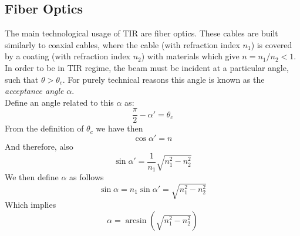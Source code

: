 \documentclass[../electromagnetism.tex]{subfiles}
\begin{document}
\subsection{Fiber Optics}
The main technological usage of TIR are fiber optics. These cables are built similarly to coaxial cables, where the cable (with refraction index $n_1$) is covered by a coating (with refraction index $n_2$) with materials which give $n=n_1/n_2<1$. In order to be in TIR regime, the beam must be incident at a particular angle, such that $\theta>\theta_c$. For purely technical reasons this angle is known as the \textit{acceptance angle} $\alpha$.\\
Define an angle related to this $\alpha$ as:
\begin{equation*}
	\frac{\pi}{2}-\alpha'=\theta_c
\end{equation*}
From the definition of $\theta_c$ we have then
\begin{equation*}
	\cos\alpha'=n
\end{equation*}
And therefore, also
\begin{equation*}
	\sin\alpha'=\frac{1}{n_1}\sqrt{n_1^2-n_2^2}
\end{equation*}
We then define $\alpha$ as follows
\begin{equation}
	\sin\alpha=n_1\sin\alpha'=\sqrt{n_1^2-n_2^2}
	\label{eq:accangsnell.tir}
\end{equation}
Which implies
\begin{equation}
	\alpha=\arcsin\left( \sqrt{n_1^2-n_2^2} \right)
	\label{eq:accang.tir}
\end{equation}
\end{document}
